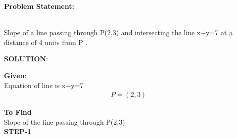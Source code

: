 \documentclass[10pt,a4paper]{report}
\begin{document}
\begin{multicols}{2}

\raggedright \textbf{Problem Statement:}\vspace{2mm}
\raggedright \\Slope of a line passing through P(2,3) and intersecting the line x+y=7 at a distance of 4 units from P  .\\
\vspace{5mm}

\raggedright \textbf{SOLUTION}:\vspace{2mm}\\

\raggedright \textbf{Given}:\vspace{2mm}\\
Equation of line is x+y=7 \\\vspace{1mm}
\begin{align}
P=(2,3)
\end{align}


\textbf{To Find }\vspace{2mm}\\
Slope of the line passing through P(2,3) \vspace{5mm}  \\ 
\textbf{STEP-1}\vspace{2mm}\\


\end{multicols}
\end{document}
